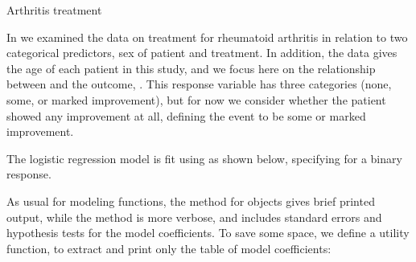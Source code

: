 \documentclass[11pt]{book}
\renewenvironment{knitrout}{\small\renewcommand{\baselinestretch}{.85}}{} %
\begin{document}
\begin{Example}[arthrit6]{Arthritis treatment}

In  we examined the data
on treatment for rheumatoid arthritis in relation to
two categorical predictors, sex of patient and treatment.
In addition, the  data
gives the age of each patient in this study,
and we focus here on the relationship between  and the
outcome, .
This response variable has three categories (none, some, or marked
improvement), but
for now we consider whether the patient showed any
improvement at all, defining the event  to be some or
marked improvement.

\begin{knitrout}
\color{fgcolor}\begin{kframe}
\begin{alltt}
\hlstd{(}\hlstd{,} \hlstd{=}\hlstd{)}
\hlopt{$} \hlkwb{<-} \hlopt{$} \hlopt{>} \hlstd{)}
\end{alltt}
\end{kframe}
\end{knitrout}
The logistic regression model is fit using  as shown below, specifying
 for a binary response.
\begin{knitrout}
\color{fgcolor}\begin{kframe}
\begin{alltt}
 \hlkwb{<-}  \hlopt{~}   
\end{alltt}
\end{kframe}
\end{knitrout}
As usual for \R modeling functions, the  method for  objects gives
brief printed output, while the  method is more verbose, and includes
standard errors and hypothesis tests for the model coefficients.  To save some
space, we define a
utility function,  to extract and print only the table of
model coefficients:
\begin{knitrout}
\color{fgcolor}\begin{kframe}
\begin{alltt}

\end{alltt}
\end{kframe}
\end{knitrout}
\end{Example}
\end{document}
